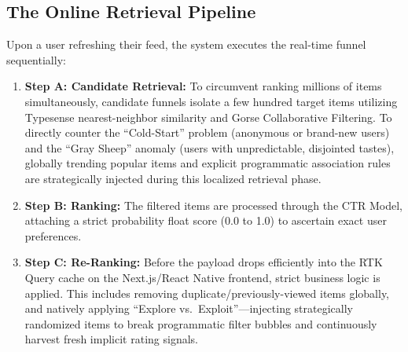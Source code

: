 \subsection{The Online Retrieval Pipeline}
Upon a user refreshing their feed, the system executes the real-time funnel sequentially:
\begin{enumerate}
    \item \textbf{Step A: Candidate Retrieval:} To circumvent ranking millions of items simultaneously, candidate funnels isolate a few hundred target items utilizing Typesense nearest-neighbor similarity and Gorse Collaborative Filtering. To directly counter the ``Cold-Start'' problem (anonymous or brand-new users) and the ``Gray Sheep'' anomaly (users with unpredictable, disjointed tastes), globally trending popular items and explicit programmatic association rules are strategically injected during this localized retrieval phase.
    \item \textbf{Step B: Ranking:} The filtered items are processed through the CTR Model, attaching a strict probability float score (0.0 to 1.0) to ascertain exact user preferences.
    \item \textbf{Step C: Re-Ranking:} Before the payload drops efficiently into the RTK Query cache on the Next.js/React Native frontend, strict business logic is applied. This includes removing duplicate/previously-viewed items globally, and natively applying ``Explore vs.\ Exploit''---injecting strategically randomized items to break programmatic filter bubbles and continuously harvest fresh implicit rating signals.
\end{enumerate}
